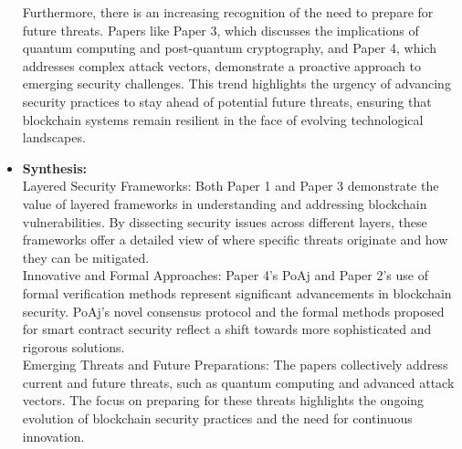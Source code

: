 \documentclass[12pt,a4paper]{article}
\begin{document}
\begin{itemize}
Furthermore, there is an increasing recognition of the need to prepare for future threats. Papers like Paper 3, which discusses the implications of quantum computing and post-quantum cryptography, and Paper 4, which addresses complex attack vectors, demonstrate a proactive approach to emerging security challenges. This trend highlights the urgency of advancing security practices to stay ahead of potential future threats, ensuring that blockchain systems remain resilient in the face of evolving technological landscapes.
    \item \textbf{Synthesis:} 
\\
Layered Security Frameworks: Both Paper 1 and Paper 3 demonstrate the value of layered frameworks in understanding and addressing blockchain vulnerabilities. By dissecting security issues across different layers, these frameworks offer a detailed view of where specific threats originate and how they can be mitigated.
\\
Innovative and Formal Approaches: Paper 4’s PoAj and Paper 2’s use of formal verification methods represent significant advancements in blockchain security. PoAj’s novel consensus protocol and the formal methods proposed for smart contract security reflect a shift towards more sophisticated and rigorous solutions.
\\
Emerging Threats and Future Preparations: The papers collectively address current and future threats, such as quantum computing and advanced attack vectors. The focus on preparing for these threats highlights the ongoing evolution of blockchain security practices and the need for continuous innovation.
\end{itemize}

\end{document}
